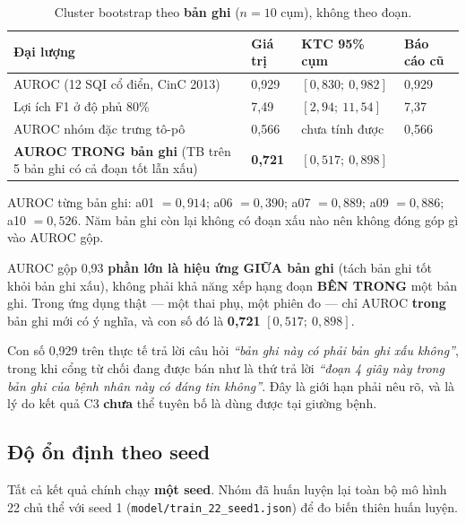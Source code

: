 \begin{table}[H]\centering\small
\caption{Cluster bootstrap theo \textbf{bản ghi} ($n = 10$ cụm), không theo đoạn.}
\label{tab:auroc}
\begin{tabular}{@{}L{6.4cm} C{2.0cm} C{3.4cm} C{2.2cm}@{}}
\toprule
\textbf{Đại lượng} & \textbf{Giá trị} & \textbf{KTC 95\% cụm} & \textbf{Báo cáo cũ} \\
\midrule
AUROC (12 SQI cổ điển, CinC 2013) & 0,929 & $[0{,}830;\ 0{,}982]$ & 0,929 \\
Lợi ích F1 ở độ phủ 80\% & 7,49 & $[2{,}94;\ 11{,}54]$ & 7,37 \\
AUROC nhóm đặc trưng tô-pô & 0,566 & chưa tính được & 0,566 \\
\midrule
\textbf{AUROC TRONG bản ghi} (TB trên 5 bản ghi có cả đoạn tốt lẫn xấu) & \textbf{0,721} &
$[0{,}517;\ 0{,}898]$ &  \\
\bottomrule
\end{tabular}
\end{table}

AUROC từng bản ghi: a01 $= 0{,}914$; a06 $= 0{,}390$; a07 $= 0{,}889$; a09 $= 0{,}886$; a10 $= 0{,}526$.
Năm bản ghi còn lại không có đoạn xấu nào nên không đóng góp gì vào AUROC gộp.

\begin{canhbao}[title={Phát hiện mới, quan trọng cho C3}]
AUROC gộp 0,93 \textbf{phần lớn là hiệu ứng GIỮA bản ghi} (tách bản ghi tốt khỏi bản ghi xấu), không
phải khả năng xếp hạng đoạn \textbf{BÊN TRONG} một bản ghi. Trong ứng dụng thật --- một thai phụ, một
phiên đo --- chỉ AUROC \textbf{trong} bản ghi mới có ý nghĩa, và con số đó là \textbf{0,721}
$[0{,}517;\ 0{,}898]$.

Con số 0,929 trên thực tế trả lời câu hỏi \textit{``bản ghi này có phải bản ghi xấu không''}, trong khi
cổng từ chối đang được bán như là thứ trả lời \textit{``đoạn 4 giây này trong bản ghi của bệnh nhân này
có đáng tin không''}. Đây là giới hạn phải nêu rõ, và là lý do kết quả C3 \textbf{chưa} thể tuyên bố là
dùng được tại giường bệnh.
\end{canhbao}

\subsection{Độ ổn định theo seed}

Tất cả kết quả chính chạy \textbf{một seed}. Nhóm đã huấn luyện lại toàn bộ mô hình 22 chủ thể với
seed 1 (\texttt{model/train\_22\_seed1.json}) để đo biến thiên huấn luyện.

